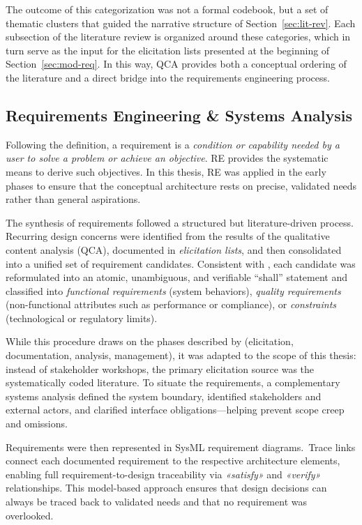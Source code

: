 The outcome of this categorization was not a formal codebook, but a set of thematic clusters that guided the narrative structure of Section~\ref{sec:lit-rev}. Each subsection of the literature review is organized around these categories, which in turn serve as the input for the elicitation lists presented at the beginning of Section~\ref{sec:mod-req}. In this way, QCA provides both a conceptual ordering of the literature and a direct bridge into the requirements engineering process.

\subsection{Requirements Engineering \& Systems Analysis}\label{subsec:re-sa} %
Following the \textcite{IEEEStandard1990} definition, a requirement is a \emph{condition or capability needed by a user to solve a problem or achieve an objective}. RE provides the systematic means to derive such objectives. In this thesis, RE was applied in the early phases to ensure that the conceptual architecture rests on precise, validated needs rather than general aspirations.

The synthesis of requirements followed a structured but literature-driven process. Recurring design concerns were identified from the results of the qualitative content analysis (QCA), documented in \emph{elicitation lists}, and then consolidated into a unified set of requirement candidates. Consistent with \textcite{glinzHandbook2020}, each candidate was reformulated into an atomic, unambiguous, and verifiable “shall” statement and classified into \emph{functional requirements} (system behaviors), \emph{quality requirements} (non-functional attributes such as performance or compliance), or \emph{constraints} (technological or regulatory limits).

While this procedure draws on the phases described by \textcite{herrmannGrundlagen2022} (elicitation, documentation, analysis, management), it was adapted to the scope of this thesis: instead of stakeholder workshops, the primary elicitation source was the systematically coded literature. To situate the requirements, a complementary systems analysis defined the system boundary, identified stakeholders and external actors, and clarified interface obligations---helping prevent scope creep and omissions.

Requirements were then represented in SysML requirement diagrams.~Trace links connect each documented requirement to the respective architecture elements, enabling full requirement-to-design traceability via \emph{«satisfy»} and \emph{«verify»} relationships. This model-based approach ensures that design decisions can always be traced back to validated needs and that no requirement was overlooked.

